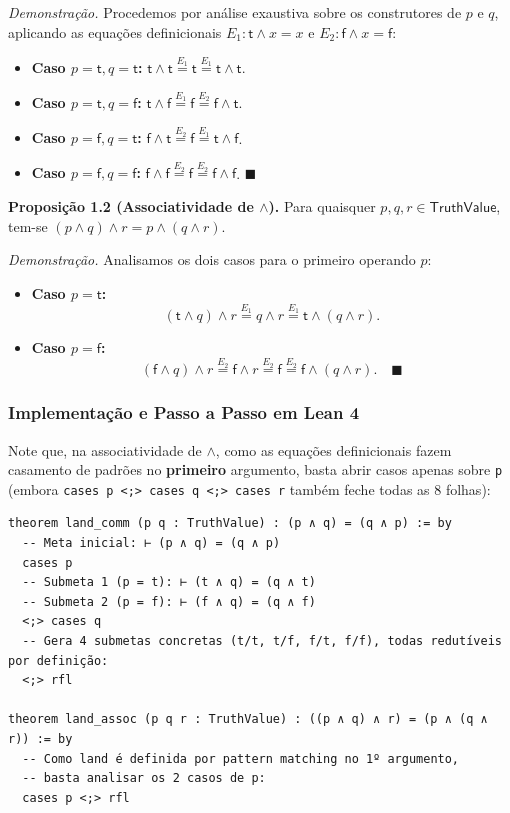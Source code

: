 \documentclass[11pt,a4paper]{scrartcl}
\begin{document}
\emph{Demonstração.} Procedemos por análise exaustiva sobre os construtores de \(p\) e \(q\), aplicando as equações definicionais \(E_1: \mathsf{t} \land x = x\) e \(E_2: \mathsf{f} \land x = \mathsf{f}\):
\begin{itemize}
\item \textbf{Caso \(p = \mathsf{t}, q = \mathsf{t}\):} \(\mathsf{t} \land \mathsf{t} \stackrel{E_1}{=} \mathsf{t} \stackrel{E_1}{=} \mathsf{t} \land \mathsf{t}\).
\item \textbf{Caso \(p = \mathsf{t}, q = \mathsf{f}\):} \(\mathsf{t} \land \mathsf{f} \stackrel{E_1}{=} \mathsf{f} \stackrel{E_2}{=} \mathsf{f} \land \mathsf{t}\).
\item \textbf{Caso \(p = \mathsf{f}, q = \mathsf{t}\):} \(\mathsf{f} \land \mathsf{t} \stackrel{E_2}{=} \mathsf{f} \stackrel{E_1}{=} \mathsf{t} \land \mathsf{f}\).
\item \textbf{Caso \(p = \mathsf{f}, q = \mathsf{f}\):} \(\mathsf{f} \land \mathsf{f} \stackrel{E_2}{=} \mathsf{f} \stackrel{E_2}{=} \mathsf{f} \land \mathsf{f}\). \(\blacksquare\)
\end{itemize}

\textbf{Proposição 1.2 (Associatividade de \(\land\)).} Para quaisquer \(p, q, r \in \mathsf{TruthValue}\), tem-se \((p \land q) \land r = p \land (q \land r)\).

\emph{Demonstração.} Analisamos os dois casos para o primeiro operando \(p\):
\begin{itemize}
\item \textbf{Caso \(p = \mathsf{t}\):}
$$(\mathsf{t} \land q) \land r \stackrel{E_1}{=} q \land r \stackrel{E_1}{=} \mathsf{t} \land (q \land r).$$
\item \textbf{Caso \(p = \mathsf{f}\):}
$$(\mathsf{f} \land q) \land r \stackrel{E_2}{=} \mathsf{f} \land r \stackrel{E_2}{=} \mathsf{f} \stackrel{E_2}{=} \mathsf{f} \land (q \land r). \quad \blacksquare$$
\end{itemize}
\subsubsection{Implementação e Passo a Passo em Lean 4}
\label{sec:org5fd96c9}
Note que, na associatividade de \(\land\), como as equações definicionais fazem casamento de padrões no \textbf{primeiro} argumento, basta abrir casos apenas sobre \texttt{p} (embora \texttt{cases p <;> cases q <;> cases r} também feche todas as 8 folhas):

\begin{lstlisting}[language=lean4,numbers=none]
theorem land_comm (p q : TruthValue) : (p ∧ q) = (q ∧ p) := by
  -- Meta inicial: ⊢ (p ∧ q) = (q ∧ p)
  cases p
  -- Submeta 1 (p = t): ⊢ (t ∧ q) = (q ∧ t)
  -- Submeta 2 (p = f): ⊢ (f ∧ q) = (q ∧ f)
  <;> cases q
  -- Gera 4 submetas concretas (t/t, t/f, f/t, f/f), todas redutíveis por definição:
  <;> rfl

theorem land_assoc (p q r : TruthValue) : ((p ∧ q) ∧ r) = (p ∧ (q ∧ r)) := by
  -- Como land é definida por pattern matching no 1º argumento,
  -- basta analisar os 2 casos de p:
  cases p <;> rfl
\end{lstlisting}
\end{document}
